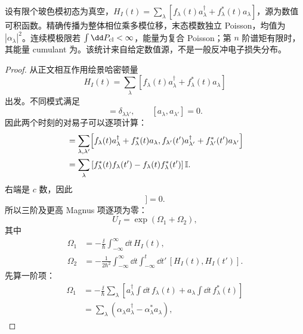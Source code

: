 \begin{theorem}
设有限个玻色模初态为真空，$H_I(t)=\sum_\lambda[f_\lambda(t)a_\lambda^\dagger+f_\lambda^*(t)a_\lambda]$，源为数值可积函数。精确传播为整体相位乘多模位移，末态模数独立 Poisson，均值为 $|\alpha_\lambda|^2$。连续模极限若 $\int\dd P_{\rm cl}<\infty$，能量为复合 Poisson；第 $n$ 阶谱矩有限时，其能量 cumulant 为。该统计来自给定数值源，不是一般反冲电子损失分布。
\end{theorem}
\begin{proof}
从正文相互作用绘景哈密顿量
\begin{equation*}
 H_I(t)
 =\sum_\lambda
 \left[f_\lambda(t)a_\lambda^\dagger
 +f_\lambda^*(t)a_\lambda\right]
\end{equation*}
出发。不同模式满足
\begin{equation*}
 [a_\lambda,a_{\lambda'}^\dagger]=\delta_{\lambda\lambda'},
 \qquad
 [a_\lambda,a_{\lambda'}]=0.
\end{equation*}
因此两个时刻的对易子可以逐项计算：
\begin{align*}
 [H_I(t),H_I(t')]
 &=\sum_{\lambda,\lambda'}
 \Bigl[
 f_\lambda(t)a_\lambda^\dagger+f_\lambda^*(t)a_\lambda,
 f_{\lambda'}(t')a_{\lambda'}^\dagger+f_{\lambda'}^*(t')a_{\lambda'}
 \Bigr]\\
 &=\sum_\lambda
 \left[
 f_\lambda^*(t)f_\lambda(t')
 -f_\lambda(t)f_\lambda^*(t')
 \right]\mathbb I.
\end{align*}
右端是 $c$ 数，因此
\begin{equation*}
 [H_I(t_1),[H_I(t_2),H_I(t_3)]]=0.
\end{equation*}
所以三阶及更高 Magnus 项逐项为零：
\begin{equation*}
 U_I=\exp(\Omega_1+\Omega_2),
\end{equation*}
其中
\begin{align*}
 \Omega_1
 &=-\frac{\ii}{\hbar}
 \int_{-\infty}^{\infty}\dd t\,H_I(t),\\
 \Omega_2
 &=-\frac1{2\hbar^2}
 \int_{-\infty}^{\infty}\dd t
 \int_{-\infty}^{t}\dd t'\,
 [H_I(t),H_I(t')].
\end{align*}
先算一阶项：
\begin{align*}
 \Omega_1
 &=-\frac{\ii}{\hbar}
 \sum_\lambda
 \left[
 a_\lambda^\dagger\int\dd t\,f_\lambda(t)
 +a_\lambda\int\dd t\,f_\lambda^*(t)
 \right]\\
 &=\sum_\lambda
 \left(\alpha_\lambda a_\lambda^\dagger
 -\alpha_\lambda^*a_\lambda\right),
\end{align*}

\end{proof}
